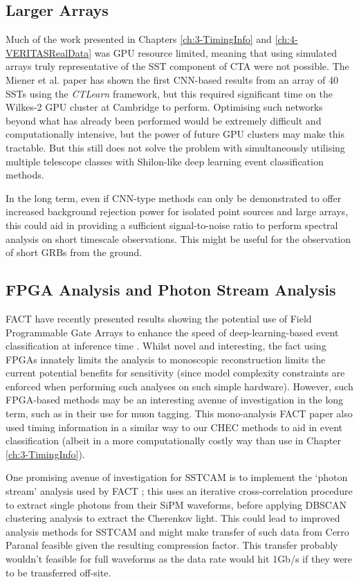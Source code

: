 \subsection{Larger Arrays}
Much of the work presented in Chapters \ref{ch:3-TimingInfo} and \ref{ch:4-VERITASRealData} was GPU resource limited, meaning that using simulated arrays truly representative of the SST component of CTA were not possible. The Miener et al. \cite{tjarkicrc} paper has shown the first CNN-based results from an array of 40 SSTs using the \textit{CTLearn} framework, but this required significant time on the Wilkes-2 GPU cluster at Cambridge to perform. Optimising such networks beyond what has already been performed would be extremely difficult and computationally intensive, but the power of future GPU clusters may make this tractable. But this still does not solve the problem with simultaneously utilising multiple telescope classes with Shilon-like deep learning event classification methods.

In the long term, even if CNN-type methods can only be demonstrated to offer increased background rejection power for isolated point sources and large arrays, this could aid in providing a sufficient signal-to-noise ratio to perform spectral analysis on short timescale observations. This might be useful for the observation of short GRBs from the ground.

\subsection{FPGA Analysis and Photon Stream Analysis}

FACT have recently presented results showing the potential use of Field Programmable Gate Arrays to enhance the speed of deep-learning-based event classification at inference time \cite{factfpga}. Whilst novel and interesting, the fact using FPGAs innately limits the analysis to monoscopic reconstruction limits the current potential benefits for sensitivity (since model complexity constraints are enforced when performing such analyses on such simple hardware). However, such FPGA-based methods may be an interesting avenue of investigation in the long term, such as in their use for muon tagging. This mono-analysis FACT paper also used timing information in a similar way to our CHEC methods to aid in event classification (albeit in a more computationally costly way than use in Chapter \ref{ch:3-TimingInfo}).

One promising avenue of investigation for SSTCAM is to implement the `photon stream' analysis used by FACT \cite{factphotonstream}; this uses an iterative cross-correlation procedure to extract single photons from their SiPM waveforms, before applying DBSCAN clustering analysis to extract the Cherenkov light. This could lead to improved analysis methods for SSTCAM and might make transfer of such data from Cerro Paranal feasible given the resulting compression factor. This transfer probably wouldn't feasible for full waveforms as the data rate would hit 1Gb/s \cite{trigrate} if they were to be transferred off-site.

